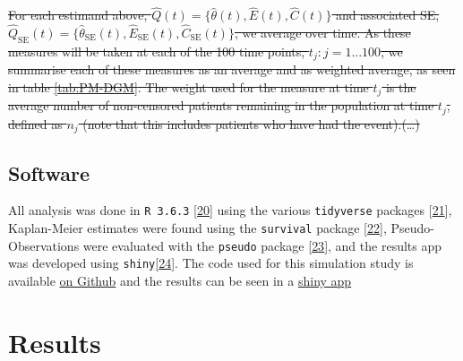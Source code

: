 \documentclass[
]{article}
\begin{document}
\sout{For each estimand above, \(\hat{Q}(t) = \{\hat{\theta}(t),\hat{E}(t), \hat{C}(t)\}\) and associated SE, \(\hat{Q}_\textrm{SE}(t) = \{\hat{\theta}_\textrm{SE}(t),\hat{E}_\textrm{SE}(t), \hat{C}_\textrm{SE}(t)\}\), we average over time. As these measures will be taken at each of the 100 time points, \(t_j:j=1...100\), we summarise each of these measures as an average and as weighted average, as seen in table \ref{tab:PM-DGM}. The weight used for the measure at time \(t_j\) is the average number of non-censored patients remaining in the population at time \(t_j\), defined as \(n_j\) (note that this includes patients who have had the event).(\ldots)}

\hypertarget{software}{%
\subsection{Software}\label{software}}

All analysis was done in \texttt{R\ 3.6.3} {[}\protect\hyperlink{ref-r_core_team_r_nodate}{20}{]} using the various \texttt{tidyverse} packages {[}\protect\hyperlink{ref-wickham_tidy_2017}{21}{]}, Kaplan-Meier estimates were found using the \texttt{survival} package {[}\protect\hyperlink{ref-therneau_package_2020}{22}{]}, Pseudo-Observations were evaluated with the \texttt{pseudo} package {[}\protect\hyperlink{ref-perme_pseudo_2017}{23}{]}, and the results app was developed using \texttt{shiny}{[}\protect\hyperlink{ref-chang_shiny_2020}{24}{]}. The code used for this simulation study is available \href{https://github.com/MyKo101/IPCW-Logistic}{on Github} and the results can be seen in a \href{https://michael-barrowman.shinyapps.io/IPCW_Calibrations/?_ga=2.129261196.1072091615.1588464259-38998367.1584541320}{shiny app}

\hypertarget{results-1}{%
\section{Results}\label{results-1}}
\end{document}
